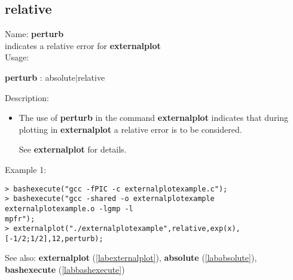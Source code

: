 \subsection{relative}
\label{labrelative}
\noindent Name: \textbf{perturb}\\
indicates a relative error for \textbf{externalplot}\\

\noindent Usage: 
\begin{center}
\textbf{perturb} : \textsf{absolute$|$relative}\\
\end{center}
\noindent Description: \begin{itemize}

\item The use of \textbf{perturb} in the command \textbf{externalplot} indicates that during
   plotting in \textbf{externalplot} a relative error is to be considered.
    
   See \textbf{externalplot} for details.
\end{itemize}
\noindent Example 1: 
\begin{center}\begin{minipage}{15cm}\begin{Verbatim}[frame=single]
> bashexecute("gcc -fPIC -c externalplotexample.c");
> bashexecute("gcc -shared -o externalplotexample externalplotexample.o -lgmp -l
mpfr");
> externalplot("./externalplotexample",relative,exp(x),[-1/2;1/2],12,perturb);
\end{Verbatim}
\end{minipage}\end{center}
See also: \textbf{externalplot} (\ref{labexternalplot}), \textbf{absolute} (\ref{lababsolute}), \textbf{bashexecute} (\ref{labbashexecute})
